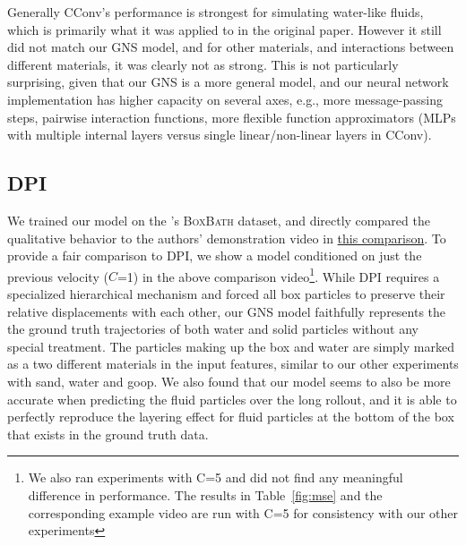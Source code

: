 \documentclass{article}
\newcommand\tabref[1]{Table~\ref{#1}}
\newcommand\domain[1]{\textsc{#1}}
\newcommand\vidboxbath[1]{\href{http://tny.sh/mrOkfpg}{#1}}
\begin{document}
Generally CConv's performance is strongest for simulating water-like fluids, which is primarily what it was applied to in the original paper. However it still did not match our GNS model, and for other materials, and interactions between different materials, it was clearly not as strong. This is not particularly surprising, given that our GNS is a more general model, and our neural network implementation has higher capacity on several axes, e.g., more message-passing steps, pairwise interaction functions, more flexible function approximators (MLPs with multiple internal layers versus single linear/non-linear layers in CConv).

%
%
%
%
%

\subsection{DPI}
We trained our model on the \citet{li2018learning}'s \domain{BoxBath} dataset, and directly compared the qualitative behavior to the authors' demonstration video in \vidboxbath{this comparison}. To provide a fair comparison to DPI, we show a model conditioned on just the previous velocity ($C$=1) in the above comparison video\footnote{We also ran experiments with C=5 and did not find any meaningful difference in performance. The results in \tabref{fig:mse} and the corresponding example video are run with C=5 for consistency with our other experiments}.
While DPI requires a specialized hierarchical mechanism and forced all box particles to preserve their relative displacements with each other, our GNS model faithfully represents the the ground truth trajectories of both water and solid particles without any special treatment. The particles making up the box and water are simply marked as a two different materials in the input features, similar to our other experiments with sand, water and goop. We also found that our model seems to also be more accurate when predicting the fluid particles over the long rollout, and it is able to perfectly reproduce the layering effect for fluid particles at the bottom of the box that exists in the ground truth data. 
\end{document}
